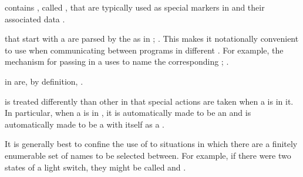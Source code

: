 \endsubsubsection%


 contains , called ,
that are typically used as special markers in  
and their associated data .

  that start with a  
are parsed by the  as  
in ; \seesection\SymbolTokens.
This makes it notationally convenient to use 
when communicating between programs in different .  
For example, the mechanism for passing  in a  uses 
 to name the corresponding ;
\seesection\OrdinaryLambdaLists.

 in  are, by definition, .


 is treated differently than other 
in that special actions are taken when a  is  in it.
In particular, when a  is  in ,
 it is automatically made to be an  
and is automatically made to be a  with itself as a .


\endsubsubsubsection%



It is generally best to confine the use of  to situations in which
there are a finitely enumerable set of names to be selected between.  For example,
if there were two states of a light switch, they might be called  and .

